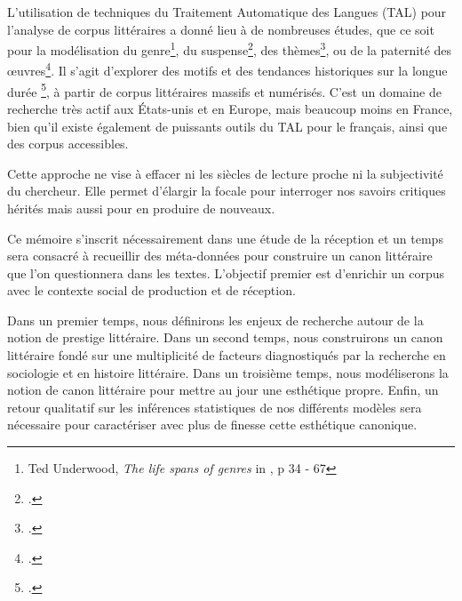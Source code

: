 L'utilisation de techniques du Traitement Automatique des Langues (TAL) pour l'analyse de corpus littéraires a donné lieu à de nombreuses études, que ce soit pour la modélisation du genre\footnote{Ted Underwood, \textit{The life spans of genres} in \cite{underwood_distant_2019}, p 34 - 67}, du suspense\footcites{piper_narrativity_2021}, des thèmes\footcites{jockers_significant_2013}, ou de la paternité des œuvres\footcites{cafiero2021psyche}. Il s'agit d'explorer des motifs et des tendances historiques sur la longue durée \footcites{braudel_mediterranee_2017}, à partir de corpus littéraires massifs et numérisés. C'est un domaine de recherche très actif aux États-unis et en Europe, mais beaucoup moins en France, bien qu'il existe également de puissants outils du TAL pour le français, ainsi que des corpus accessibles.

Cette approche ne vise à effacer ni les siècles de lecture proche ni la subjectivité du chercheur. Elle permet d'élargir la focale pour interroger nos savoirs critiques hérités mais aussi pour en produire de nouveaux. 

Ce mémoire s'inscrit nécessairement dans une étude de la réception et un temps sera consacré à recueillir des méta-données pour construire un canon littéraire que l'on questionnera dans les textes. L'objectif premier est d'enrichir un corpus avec le contexte social de production et de réception. 

Dans un premier temps, nous définirons les enjeux de recherche autour de la notion de prestige littéraire. Dans un second temps, nous construirons un canon littéraire fondé sur une multiplicité de facteurs diagnostiqués par la recherche en sociologie et en histoire littéraire. Dans un troisième temps, nous modéliserons la notion de canon littéraire pour mettre au jour une esthétique propre. Enfin, un retour qualitatif sur les inférences statistiques de nos différents modèles sera nécessaire pour caractériser avec plus de finesse cette esthétique canonique.